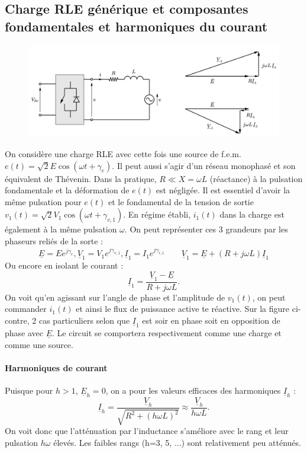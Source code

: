 	\subsection{Charge RLE générique et composantes fondamentales et harmoniques du courant}
		\begin{figure}
			\vspace{-5mm}
			\includegraphics[scale=0.25]{ch4/21}
			\end{figure}
			On considère une charge RLE avec cette fois une source de f.e.m. $e(t) = \sqrt{2}E\cos (\omega t + \gamma _e)$. Il peut aussi s'agir d'un réseau monophasé et son équivalent de Thévenin. Dans la pratique, $R\ll X = \omega L$ (réactance) à la pulsation fondamentale et la déformation de $e(t)$ est négligée. Il est essentiel d'avoir la même pulsation pour $e(t)$ et le fondamental de la tension de sortie $v_1(t) = \sqrt{2}V_1 \cos (\omega t +\gamma _{v,1})$. En régime établi, $i_1(t)$ dans la charge est également à la même pulsation $\omega$. On peut représenter ces 3 grandeurs par les phaseurs reliés de la sorte :
			\begin{equation}
				\underline{E} = Ee^{j\gamma _e}, \underline{V}_1 = V_1e^{j\gamma _{v,1}}, \underline{I}_1 = I_1e^{j\gamma _{i,1}} \qquad \underline{V}_1=\underline{E}+(R+j\omega L)\underline{I}_1
			\end{equation}
			Ou encore en isolant le courant :
			\begin{equation}
				\underline{I}_1 = \frac{\underline{V}_1-\underline{E}}{R+j\omega L}.
			\end{equation}
			On voit qu'en agissant sur l'angle de phase et l'amplitude de $v_1(t)$, on peut commander $i_{1}(t)$ et ainsi le flux de puissance active te réactive. Sur la figure ci-contre, 2 cas particuliers selon que $\underline{I}_1$ est soir en phase soit en opposition de phase avec $\underline{E}$. Le circuit se comportera respectivement comme une charge et comme une source. 
			
			\paragraph{Harmoniques de courant} \quad Puisque pour $h>1$, $\underline{E}_h =0$, on a pour les valeurs efficaces des harmoniques $\underline{I}_h$ : 
			\begin{equation}
				\underline{I}_h = \frac{\underline{V}_h}{\sqrt{R^2+(h\omega L)^2}} \approx \frac{\underline{V}_h}{h\omega L}. 
			\end{equation}
			On voit donc que l'atténuation par l'inductance s'améliore avec le rang et leur pulsation $h\omega$ élevés. Les faibles rangs (h=3, 5, ...) sont relativement peu atténués. 
			
